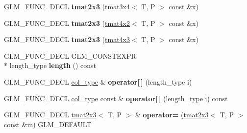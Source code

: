 \begin{DoxyCompactItemize}
\item 
\hypertarget{structglm_1_1tmat2x3_aa2f1a3ee821a8ac9f2ee610a27b2786b}{G\-L\-M\-\_\-\-F\-U\-N\-C\-\_\-\-D\-E\-C\-L {\bfseries tmat2x3} (\hyperlink{structglm_1_1tmat3x4}{tmat3x4}$<$ T, P $>$ const \&x)}\label{structglm_1_1tmat2x3_aa2f1a3ee821a8ac9f2ee610a27b2786b}

\item 
\hypertarget{structglm_1_1tmat2x3_a0e17446454497d323a6f1dc09a68ea5f}{G\-L\-M\-\_\-\-F\-U\-N\-C\-\_\-\-D\-E\-C\-L {\bfseries tmat2x3} (\hyperlink{structglm_1_1tmat4x2}{tmat4x2}$<$ T, P $>$ const \&x)}\label{structglm_1_1tmat2x3_a0e17446454497d323a6f1dc09a68ea5f}

\item 
\hypertarget{structglm_1_1tmat2x3_a1c167271dd959e664021e1accd456bf1}{G\-L\-M\-\_\-\-F\-U\-N\-C\-\_\-\-D\-E\-C\-L {\bfseries tmat2x3} (\hyperlink{structglm_1_1tmat4x3}{tmat4x3}$<$ T, P $>$ const \&x)}\label{structglm_1_1tmat2x3_a1c167271dd959e664021e1accd456bf1}

\item 
\hypertarget{structglm_1_1tmat2x3_aa5dc7f33071eb7d5233d0748ffcdb9f0}{G\-L\-M\-\_\-\-F\-U\-N\-C\-\_\-\-D\-E\-C\-L G\-L\-M\-\_\-\-C\-O\-N\-S\-T\-E\-X\-P\-R \\*
length\-\_\-type {\bfseries length} () const }\label{structglm_1_1tmat2x3_aa5dc7f33071eb7d5233d0748ffcdb9f0}

\item 
\hypertarget{structglm_1_1tmat2x3_a02f967c3523ed282c9dfa3b75e717bef}{G\-L\-M\-\_\-\-F\-U\-N\-C\-\_\-\-D\-E\-C\-L \hyperlink{structglm_1_1tvec3}{col\-\_\-type} \& {\bfseries operator\mbox{[}$\,$\mbox{]}} (length\-\_\-type i)}\label{structglm_1_1tmat2x3_a02f967c3523ed282c9dfa3b75e717bef}

\item 
\hypertarget{structglm_1_1tmat2x3_ab4991d1eff548787241acd1c2636cda9}{G\-L\-M\-\_\-\-F\-U\-N\-C\-\_\-\-D\-E\-C\-L \hyperlink{structglm_1_1tvec3}{col\-\_\-type} const \& {\bfseries operator\mbox{[}$\,$\mbox{]}} (length\-\_\-type i) const }\label{structglm_1_1tmat2x3_ab4991d1eff548787241acd1c2636cda9}

\item 
\hypertarget{structglm_1_1tmat2x3_a1dc530650ac58a87d120532ad77ed332}{G\-L\-M\-\_\-\-F\-U\-N\-C\-\_\-\-D\-E\-C\-L \hyperlink{structglm_1_1tmat2x3}{tmat2x3}$<$ T, P $>$ \& {\bfseries operator=} (\hyperlink{structglm_1_1tmat2x3}{tmat2x3}$<$ T, P $>$ const \&m) G\-L\-M\-\_\-\-D\-E\-F\-A\-U\-L\-T}\label{structglm_1_1tmat2x3_a1dc530650ac58a87d120532ad77ed332}


\end{DoxyCompactItemize}

